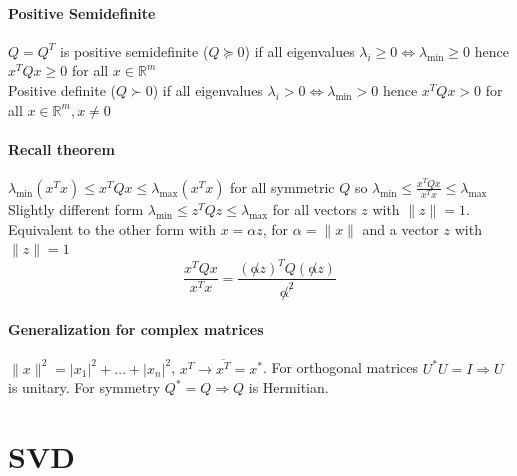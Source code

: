 \documentclass[10pt]{report}
\begin{document}
\paragraph{Positive Semidefinite} $Q = Q^T$ is positive semidefinite ($Q \succeq 0$) if all eigenvalues $\lambda_i \geq 0 \Leftrightarrow \lambda_{\min} \geq 0$ hence $x^T Q x\geq 0$ for all $x\in \mathbb{R}^m$\\
Positive definite ($Q \succ 0$) if all eigenvalues $\lambda_i > 0 \Leftrightarrow \lambda_{\min} > 0$ hence $x^TQx > 0$ for all $x \in \mathbb{R}^m, x\neq 0$
\paragraph{Recall theorem} $\lambda_{\min}(x^T x) \leq x^T Q x \leq \lambda_{\max}(x^T x)$ for all symmetric $Q$ so $\lambda_{\min} \leq \frac{x^T Q x}{x^T x} \leq \lambda_{\max}$\\
Slightly different form $\lambda_{\min} \leq z^T Q z \leq \lambda_{\max}$ for all vectors $z$ with $\|z\| = 1$. Equivalent to the other form with $x = \alpha z$, for $\alpha = \|x\|$ and a vector $z$ with $\|z\| = 1$
$$ \frac{x^T Q x}{x^T x} = \frac{(\not\alpha z)^T Q (\not\alpha z)}{\not\alpha^{\not 2}}$$
\paragraph{Generalization for complex matrices} $\|x\|^2 = |x_1|^2 + \ldots + |x_n|^2$, $x^T \longrightarrow \overline{x^T} = x^*$. For orthogonal matrices $U^*U=I \Rightarrow U$ is unitary. For symmetry $Q^* = Q \Rightarrow Q$ is Hermitian.
\section{SVD}
\end{document}

